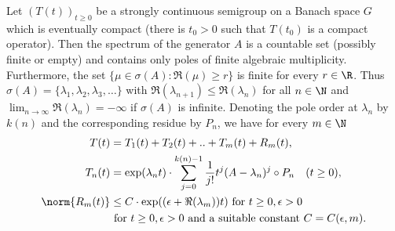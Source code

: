 \begin{theorem}\label{thm:b4-2.1}
Let $(T(t))_{t \geq 0}$ be a strongly continuous semigroup on a Banach space $G$ which is eventually compact (\ie  there is $t_{0} > 0$ such that $T(t_{0})$ is a compact operator).
Then the spectrum of the generator $A$ is a countable set (possibly finite or empty) and contains only poles of finite algebraic multiplicity.
Furthermore, the set $\{\mu \in \sigma(A) \colon \Re(\mu) \geq r\}$ is finite for every $r \in \R$.
Thus
	$\sigma(A) = \{\lambda_1,\lambda_2,\lambda_3, \ldots \}$ with $\Re(\lambda_{n+1}) \leq \Re(\lambda_n)$ for all $n \in \N$ and
	$\lim_{n \to \infty} \Re(\lambda_n) = -\infty$ if\/ $\sigma(A)$ is infinite.
	Denoting the pole order at $\lambda_n$ by $k(n)$ and the corresponding residue
	by $P_n$, we have for every $m \in \N$
\begin{equation}\label{eq:b4-2.1}
\begin{aligned}
	T(t) &= T_1(t) + T_2(t) + .. + T_m(t) + R_m(t) ,\\
	T_n(t) &= \exp(\lambda_n t) \cdot \sum_{j=0}^{k(n)-1} \frac{1}{j!}t^j(A - \lambda_n)^j \circ P_n 
		\quad (t \geq 0) ,\\
	\norm{R_m(t)} & \leq C \cdot \exp((\epsilon +\Re(\lambda_m))t) \text{ for }  t \geq 0, \epsilon >0\\
			&  \text{ for }  t \geq 0, \epsilon >0  \text{ and a suitable	constant } C=C(\epsilon ,m) .
		\end{aligned}
	\end{equation}
\end{theorem}
